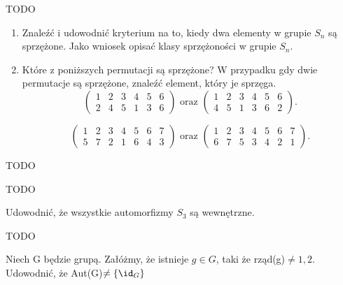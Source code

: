 \begin{solution}

	TODO		
\end{solution}
\begin{problem}[4]

	\begin{enumerate}[label=\alph*)]
		\item Znaleźć i udowodnić kryterium na to, kiedy dwa elementy w grupie $S_{n}$ są sprzężone. Jako wniosek opisać klasy sprzężoności w grupie $S_{n}$.
		\item Które z poniższych permutacji są sprzężone? W przypadku gdy dwie permutacje są sprzężone, znaleźć element, który je sprzęga.
			\[
			       \begin{pmatrix} 1 & 2 & 3 & 4 & 5 & 6 \\
				 2 & 4 & 5 & 1 & 3 & 6 
				\end{pmatrix} \text{ oraz } 
					\begin{pmatrix} 
			         1 & 2 & 3 & 4 & 5 & 6 \\
		                 4 & 5 & 1 & 3 & 6 & 2\end{pmatrix} 
			.\] 

			\[
				\begin{pmatrix} 1 & 2 & 3 & 4 & 5 & 6 &7 \\
				5 & 7 & 2 & 1 & 6 & 4 & 3 
			\end{pmatrix} 
			\text{ oraz }
					\begin{pmatrix} 1 & 2 & 3 & 4 & 5 & 6 & 7 \\
					6 & 7 & 5 & 3 & 4 & 2 & 1
				\end{pmatrix} 
			.\] 
	\end{enumerate}
\end{problem}
\begin{solution}

	TODO
\end{solution}
\begin{solution}
	
	TODO
\end{solution} 
\begin{problem}[5]
	
	Udowodnić, że wszystkie automorfizmy  $S_3$ są wewnętrzne. 
\end{problem} 
\begin{solution}
	
	TODO
\end{solution} 
\begin{problem}[6]
	
	Niech G będzie grupą. Załóżmy, że istnieje $g\in G$, taki że rząd(g)$\neq 1,2$. Udowodnić, że Aut(G)$\neq \{\id_{G}\} $
\end{problem} 
